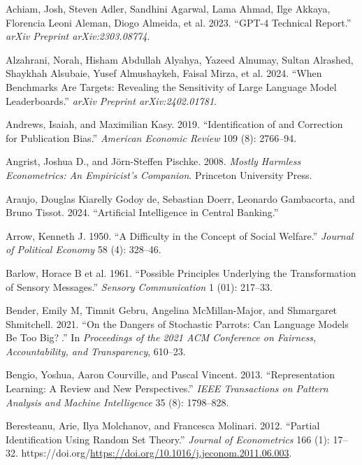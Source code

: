 \documentclass[
]{article}
\newlength{\cslhangindent}
\newenvironment{CSLReferences}[2] %
 {\begin{list}{}{%
  \setlength{\itemindent}{0pt}
  \setlength{\leftmargin}{0pt}
  \setlength{\parsep}{0pt}
  \ifodd #1
   \setlength{\leftmargin}{\cslhangindent}
   \setlength{\itemindent}{-1\cslhangindent}
  \fi
  \setlength{\itemsep}{#2\baselineskip}}}
 {\end{list}}
\begin{document}
\label{refs}
\begin{CSLReferences}{1}{0}
Achiam, Josh, Steven Adler, Sandhini Agarwal, Lama Ahmad, Ilge Akkaya,
Florencia Leoni Aleman, Diogo Almeida, et al. 2023. {``GPT-4 Technical
Report.''} \emph{arXiv Preprint arXiv:2303.08774}.

Alzahrani, Norah, Hisham Abdullah Alyahya, Yazeed Alnumay, Sultan
Alrashed, Shaykhah Alsubaie, Yusef Almushaykeh, Faisal Mirza, et al.
2024. {``When Benchmarks Are Targets: Revealing the Sensitivity of Large
Language Model Leaderboards.''} \emph{arXiv Preprint arXiv:2402.01781}.

Andrews, Isaiah, and Maximilian Kasy. 2019. {``Identification of and
Correction for Publication Bias.''} \emph{American Economic Review} 109
(8): 2766--94.

Angrist, Joshua D., and Jörn-Steffen Pischke. 2008. \emph{Mostly
Harmless Econometrics: An Empiricist's Companion}. Princeton University
Press.

Araujo, Douglas Kiarelly Godoy de, Sebastian Doerr, Leonardo Gambacorta,
and Bruno Tissot. 2024. {``Artificial Intelligence in Central
Banking.''}

Arrow, Kenneth J. 1950. {``A Difficulty in the Concept of Social
Welfare.''} \emph{Journal of Political Economy} 58 (4): 328--46.

Barlow, Horace B et al. 1961. {``Possible Principles Underlying the
Transformation of Sensory Messages.''} \emph{Sensory Communication} 1
(01): 217--33.

Bender, Emily M, Timnit Gebru, Angelina McMillan-Major, and Shmargaret
Shmitchell. 2021. {``On the Dangers of Stochastic Parrots: Can Language
Models Be Too Big?🦜.''} In \emph{Proceedings of the 2021 ACM Conference
on Fairness, Accountability, and Transparency}, 610--23.

Bengio, Yoshua, Aaron Courville, and Pascal Vincent. 2013.
{``Representation Learning: A Review and New Perspectives.''} \emph{IEEE
Transactions on Pattern Analysis and Machine Intelligence} 35 (8):
1798--828.

Beresteanu, Arie, Ilya Molchanov, and Francesca Molinari. 2012.
{``Partial Identification Using Random Set Theory.''} \emph{Journal of
Econometrics} 166 (1): 17--32.
https://doi.org/\url{https://doi.org/10.1016/j.jeconom.2011.06.003}.


\end{CSLReferences}
\end{document}
